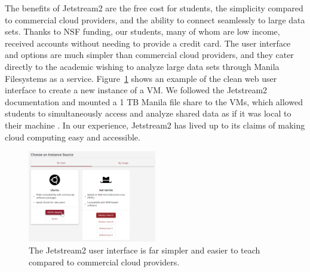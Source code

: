 \documentclass[12pt]{article}
\begin{document}
The benefits of Jetstream2 are the free cost for students, the simplicity compared to commercial cloud providers, and the ability to connect seamlessly to large data sets.
Thanks to NSF funding, our students, many of whom are low income, received accounts without needing to provide a credit card.
The user interface and options are much simpler than commercial cloud providers, and they cater directly to the academic wishing to analyze large data sets through Manila Filesystems as a service.
Figure~\ref{fig:jetstream} shows an example of the clean web user interface to create a new instance of a VM.
We followed the Jetstream2 documentation and mounted a 1 TB Manila file share to the VMs, which allowed students to simultaneously access and analyze shared data as if it was local to their machine \cite{manila}.
In our experience, Jetstream2 has lived up to its claims of making cloud computing easy and accessible.

\begin{figure}[h]
    \centering
    \includegraphics[width=0.5\textwidth]{jetstream}
    \caption{The Jetstream2 user interface is far simpler and easier to teach compared to commercial cloud providers.}
    \label{fig:jetstream}
\end{figure}
\end{document}
